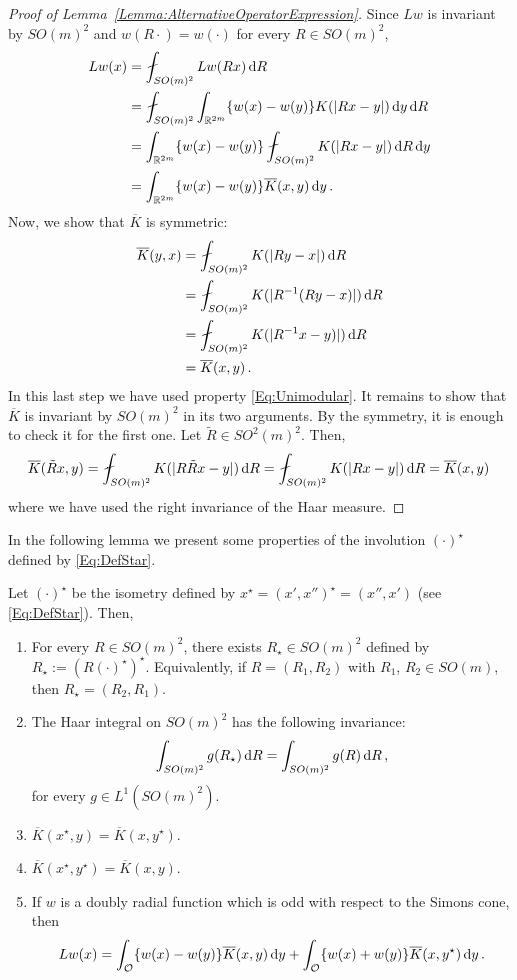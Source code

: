 \begin{proof}[Proof of Lemma~\ref{Lemma:AlternativeOperatorExpression}]
Since $Lw$ is invariant by $SO(m)^2$ and $w(R \cdot) = w(\cdot)$ for every $R\in SO(m)^2$,
\begin{align*}
Lw(x) &= \average_{SO(m)^2} Lw(Rx)\d R\\
&=  \average_{SO(m)^2} \int_{\R^{2m}} \{w(x) - w(y)\}K(|Rx - y|) \d y \d R\\
&= \int_{\R^{2m}} \{w(x) - w(y)\}  \average_{SO(m)^2} K(|Rx - y|) \d R  \d y\\
&= \int_{\R^{2m}} \{w(x) - w(y)\}  \overline{K}(x,y) \d y\,.
\end{align*}
Now, we show that $\overline{K}$ is symmetric:
\begin{align*}
\overline{K}(y,x) &= \average_{SO(m)^2} K(|R y - x|)\d R \\
&= \average_{SO(m)^2} K(|R^{-1} (R y - x)|)\d R \\
&= \average_{SO(m)^2} K(|R^{-1}x-y)|)\d R \\
&= \overline{K}(x,y)\,.
\end{align*}
In this last step we have used property \eqref{Eq:Unimodular}. It remains to show that
$\overline{K}$ is invariant by $SO(m)^2$ in its two arguments. By the symmetry, it is enough to
check it for the first one. Let $\tilde{R} \in SO^2(m)^2$. Then,
$$
\overline{K} (\tilde{R}x, y) = \average_{SO(m)^2} K(|R \tilde{R} x - y|)\d R  = \average_{SO(m)^2} K(|R x - y|)\d R = \overline{K} (x, y)\,
$$
where we have used the right invariance of the Haar measure.
\end{proof}

In the following lemma we present some properties of the involution $(\cdot)^\star$ defined by
\eqref{Eq:DefStar}.

\begin{lemma}
\label{Lemma:PropertiesStar}
Let $(\cdot)^\star$ be the isometry defined by $x^\star = (x',x'')^\star = (x'', x')$
(see \eqref{Eq:DefStar}).
Then,
\begin{enumerate}
\item 	
For every $R\in SO(m)^2$, there exists  $R_\star\in SO(m)^2$ defined by $R_\star :=
(R(\cdot)^\star)^\star$. Equivalently, if $R = (R_1, R_2)$ with $R_1$, $R_2 \in SO(m)$, then
$R_\star = (R_2, R_1)$.
\item
The Haar integral on $SO(m)^2$ has the following invariance:
\begin{equation}
\label{Eq:InvarianceByStar}
\int_{SO(m)^2} g(R_\star) \,\mathrm{d} R = \int_{SO(m)^2} g(R) \,\mathrm{d} R \,,
\end{equation}
for every $g \in L^1(SO(m)^2)$.
\item $\overline{K}(x^\star,y) = \overline{K} (x,y^\star)$.
\item $\overline{K}(x^\star,y^\star) = \overline{K} (x,y)$.
\item If $w$ is a doubly radial function which is odd with respect to the Simons cone, then
$$
Lw (x) = \int_{\mathcal{O}} \{w(x) - w(y) \} \overline{K}(x, y) \,\mathrm{d} y +  \int_{\mathcal{O}} \{w(x) + w(y) \} \overline{K}(x, y^\star) \,\mathrm{d} y \,.
$$
\end{enumerate}
\end{lemma}


